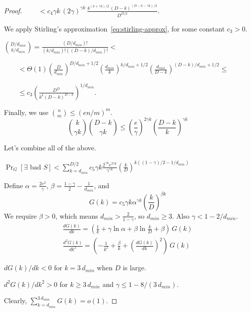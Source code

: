 \begin{proof}
    $\qquad<c_4\gamma k\,(2\gamma)^{\gamma k}\,\frac{
        k^{(k+\gamma k)/2}\,
        (D-k)^{(D-k-\gamma k)/2}
    }{D^{D/2}}$.

    We apply Stirling's approximation~\eqref{eq:stirling-approx},
    for some constant $c_3>0$.

    $\binom{D/d_{min}}{k/d_{min}}=\frac{(D/d_{min})!}{(k/d_{min})!((D-k)/d_{min})!}<$
    
    $\qquad<\Theta(1)
    \left(\frac{D}{d_{min}}\right)^{D/d_{min}+1/2}
    \left(\frac{d_{min}}{k}\right)^{k/d_{min}+1/2}
    \left(\frac{d_{min}}{D-k}\right)^{(D-k)/d_{min}+1/2}\leq$
    
    $\qquad\leq c_3\left(\frac{D^D}{k^k(D-k)^{D-k}}\right)^{1/d_{min}}$.
    
    Finally, we use $\binom{n}{m}\leq(en/m)^m$.
    \begin{equation*}
        \binom{k}{\gamma k}\binom{D-k}{\gamma k}
        \leq\left(\frac{e}{\gamma}\right)^{2\gamma k}\left(\frac{D-k}{k}\right)^{\gamma k}
    \end{equation*}
    
    Let's combine all of the above.
    
    $\Pr_G[\exists\text{ bad }S]<\sum_{k=d_{min}}^{D/2}{c_5\gamma k
    \frac{2^{\gamma k}e^{2\gamma k}}{\gamma^{\gamma k}}
    \left(\frac{k}{D}\right)^{k((1-\gamma)/2-1/d_{min})}}$
    
    Define $\alpha=\frac{2e^2}{\gamma}$,
    $\beta=\frac{1-\gamma}{2}-\frac{1}{d_{min}}$, and
    \begin{equation}
        G(k)=c_5\gamma k\alpha^{\gamma k}\left(\frac{k}{D}\right)^{\beta k}
    \end{equation}
    We require $\beta>0$, which means $d_{min}>\frac{2}{1-\gamma}$,
    so $d_{min}\geq3$. Also $\gamma<1-2/d_{min}$.
    \begin{gather}
        \frac{dG(k)}{dk}=\left(\frac{1}{k}+\gamma\ln\alpha+\beta\ln\frac{k}{D}+\beta\right)\,G(k)\\
        \frac{d^2G(k)}{dk^2}=\left(-\frac{1}{k^2}+\frac{\beta}{k}+\left(\frac{dG(k)}{dk}\right)^2\right)\,G(k)
    \end{gather}
    
    $dG(k)/dk<0$ for $k=3\,d_{min}$ when $D$ is large.
    
    $d^2G(k)/dk^2>0$ for $k\geq3\,d_{min}$ and $\gamma\leq1-8/(3\,d_{min})$. %
    
    Clearly, $\sum_{k=d_{min}}^{3\,d_{min}}{G(k)}=o(1)$.
    

\end{proof}
